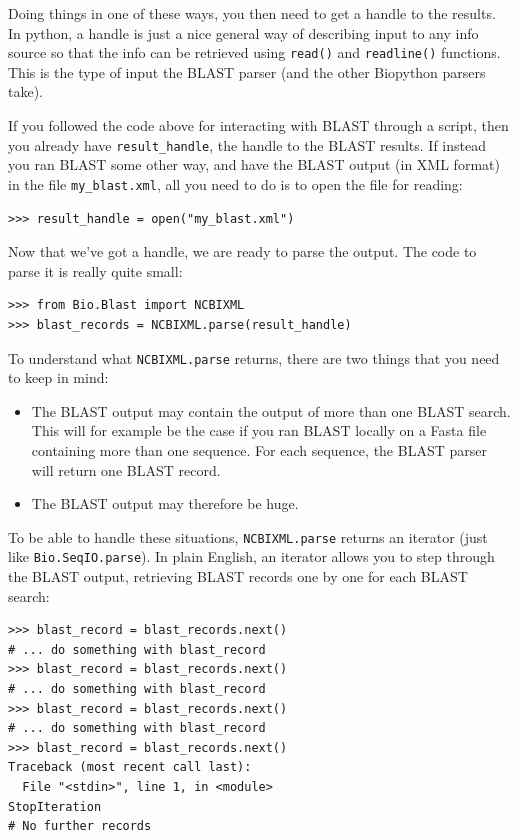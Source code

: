 \documentclass{report}
\begin{document}
Doing things in one of these ways, you then need to get a handle
to the results. In python, a handle is just a nice general way of
describing input to any info source so that the info can be retrieved
using \verb|read()| and \verb|readline()| functions. This is the type
of input the BLAST parser (and the other Biopython parsers take). 

If you followed the code above for interacting with BLAST through a
script, then you already have \verb|result_handle|, the handle to the
BLAST results. If instead you ran BLAST some other way, and have the
BLAST output (in XML format) in the file \verb|my_blast.xml|, all you
need to do is to open the file for reading:

\begin{verbatim}
>>> result_handle = open("my_blast.xml")
\end{verbatim}

Now that we've got a handle, we are ready to parse the output. The
code to parse it is really quite small:

\begin{verbatim}
>>> from Bio.Blast import NCBIXML
>>> blast_records = NCBIXML.parse(result_handle)
\end{verbatim}

To understand what \verb|NCBIXML.parse| returns, there are two things
that you need to keep in mind:
\begin{itemize}
\item The BLAST output may contain the output of more than
one BLAST search. This will for example be the case if you ran BLAST locally
on a Fasta file containing more than one sequence. For each sequence, the
BLAST parser will return one BLAST record.
\item The BLAST output may therefore be huge.
\end{itemize}

To be able to handle these situations, \verb|NCBIXML.parse| returns an
iterator (just like \verb|Bio.SeqIO.parse|). In plain English, an iterator
allows you to step through the BLAST output, retrieving BLAST records one
by one for each BLAST search:

\begin{verbatim}
>>> blast_record = blast_records.next()
# ... do something with blast_record
>>> blast_record = blast_records.next()
# ... do something with blast_record
>>> blast_record = blast_records.next()
# ... do something with blast_record
>>> blast_record = blast_records.next()
Traceback (most recent call last):
  File "<stdin>", line 1, in <module>
StopIteration
# No further records
\end{verbatim}
\end{document}
